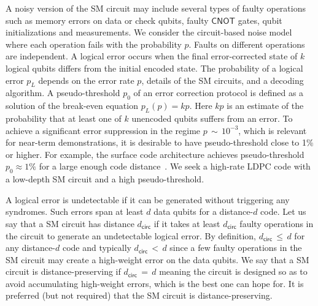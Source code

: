 \documentclass{article}
\newcommand{\Gate}[1]{\mathsf{#1}}
\newcommand{\cnotgate}{\Gate{CNOT}}
\newcommand{\dcirc}{d_{\mathsf{circ}}}
\begin{document}
A noisy version of the SM circuit may include 
several types of faulty operations such as
memory errors
on  data or check qubits, faulty $\cnotgate$ gates, qubit initializations
and measurements. 
We consider the circuit-based noise model~\cite{fowler2009high}
where each operation 
fails  with the probability $p$.
Faults on different operations are independent.
A logical error occurs when the final error-corrected state of $k$ logical qubits differs from the initial encoded state. 
The probability of a logical error $p_L$ depends on the  error rate $p$,
details of the SM circuits, and a decoding algorithm.
A pseudo-threshold $p_0$ of an error correction protocol is defined
as a solution of  the break-even equation $p_L(p)=kp$.
Here $kp$ is an estimate of the probability that at least one of $k$ unencoded qubits suffers from an error.
 To achieve a significant error suppression in the regime $p\,{\sim}\,10^{-3}$, which is relevant for near-term demonstrations, it is desirable to have pseudo-threshold 
close to 1\% or higher.
For example, the surface code architecture achieves  pseudo-threshold $p_0\approx 1\%$ for a large enough code distance~\cite{fowler2009high}.
We seek a high-rate LDPC code with a low-depth %
SM circuit and a high pseudo-threshold.

A logical error is undetectable if it can be generated without
triggering any syndromes.  Such errors 
span at least $d$ data qubits for a distance-$d$ code.
Let us say that a SM circuit has distance $\dcirc$ if
it takes at least $\dcirc$ faulty operations in the circuit to generate an undetectable logical error.
By definition, $\dcirc\,{\le}\,d$ for any distance-$d$ code
and typically $\dcirc\,{<}\,d$ since a few faulty operations in the SM circuit may create a high-weight error on the data qubits. 
We say that a SM circuit is  distance-preserving
if $\dcirc\,{=}\,d$ meaning the  circuit is designed so as to avoid accumulating high-weight errors, which is the best one can hope for. 
It is preferred (but not required)  that the SM circuit is distance-preserving.
\end{document}
